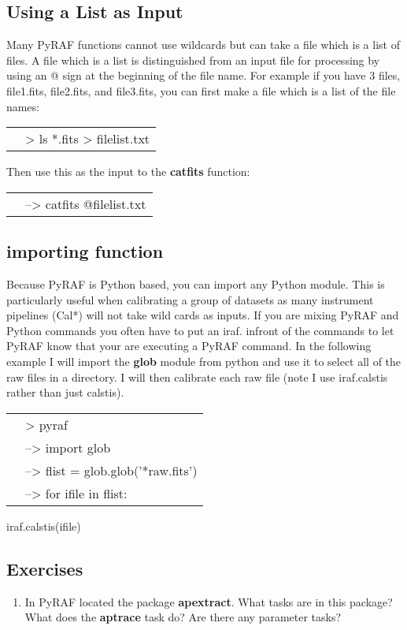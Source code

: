 \subsection{Using a List as Input}
Many PyRAF functions cannot use wildcards but can take a file which is a list of files. A file which is a list is distinguished from an input file for processing by using an @ sign at the beginning of the file name. For example if you have 3 files, file1.fits, file2.fits, and file3.fits, you can first make a file which is a list of the file names:

\begin{minipage}{4in}
\setlength{\oddsidemargin}{0.25 in}
\setlength{\evensidemargin}{0.25 in}
\begin{tabular}{ll}
& {\color{RoyalBlue}> ls *.fits > filelist.txt } \\
\end{tabular}


Then use this as the input to the {\bf catfits} function: \\
\begin{tabular}{ll}
& {\color{RoyalBlue}--> catfits @filelist.txt } \\
\end{tabular}
\end{minipage}


\subsection{importing function}
Because PyRAF is Python based, you can import any Python module. This is particularly useful when calibrating a group of datasets as many instrument pipelines (Cal*) will not take wild cards as inputs.  If you are mixing PyRAF and Python commands you often have to put an iraf. infront of the commands to let PyRAF know that your are executing a PyRAF command. In the following example I will import the {\bf glob} module from python and use it to select all of the raw files in a directory. I will then calibrate each raw file (note I use iraf.calstis rather than just calstis).

\begin{minipage}{4in}
\setlength{\oddsidemargin}{0.25 in}
\setlength{\evensidemargin}{0.25 in}
\begin{tabular}{ll}
& {\color{RoyalBlue}> pyraf}\\
& {\color{RoyalBlue}--> import glob}\\
& {\color{RoyalBlue}--> flist = glob.glob('*raw.fits')}\\
& {\color{RoyalBlue}--> for ifile in flist:}\\
\end{tabular}
\setlength{\parindent}{0.5 in}

{\color{RoyalBlue}iraf.calstis(ifile)}\\
\end{minipage}

\subsection{Exercises}
\begin{enumerate}
\item In PyRAF located the package {\bf apextract}. What tasks are in this package? What does the {\bf aptrace} task do? Are there any parameter tasks?
\end{enumerate}


